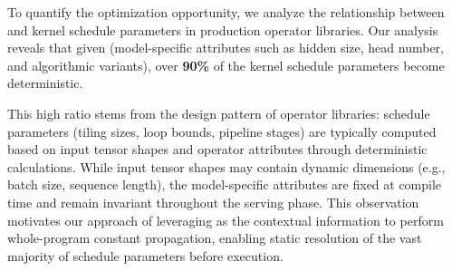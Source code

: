 To quantify the optimization opportunity, we analyze the relationship between \initialconsts and kernel schedule parameters in production operator libraries.
Our analysis reveals that given \initialconsts (model-specific attributes such as hidden size, head number, and algorithmic variants), over \textbf{90\%} of the kernel schedule parameters become deterministic.

This high ratio stems from the design pattern of operator libraries: schedule parameters (tiling sizes, loop bounds, pipeline stages) are typically computed based on input tensor shapes and operator attributes through deterministic calculations.
While input tensor shapes may contain dynamic dimensions (e.g., batch size, sequence length), the model-specific attributes are fixed at compile time and remain invariant throughout the serving phase.
This observation motivates our approach of leveraging \initialconsts as the contextual information to perform whole-program constant propagation, enabling static resolution of the vast majority of schedule parameters before execution.
